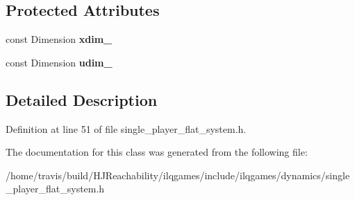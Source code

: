 \subsection*{Protected Attributes}
\begin{DoxyCompactItemize}
\item 
const Dimension {\bfseries xdim\+\_\+}\hypertarget{classilqgames_1_1_single_player_flat_system_aa658a8f808613f170ace84b6aca63a05}{}\label{classilqgames_1_1_single_player_flat_system_aa658a8f808613f170ace84b6aca63a05}

\item 
const Dimension {\bfseries udim\+\_\+}\hypertarget{classilqgames_1_1_single_player_flat_system_a24a3044071823bdd4af74d8d5b89d3d7}{}\label{classilqgames_1_1_single_player_flat_system_a24a3044071823bdd4af74d8d5b89d3d7}

\end{DoxyCompactItemize}


\subsection{Detailed Description}


Definition at line 51 of file single\+\_\+player\+\_\+flat\+\_\+system.\+h.



The documentation for this class was generated from the following file\+:\begin{DoxyCompactItemize}
\item 
/home/travis/build/\+H\+J\+Reachability/ilqgames/include/ilqgames/dynamics/single\+\_\+player\+\_\+flat\+\_\+system.\+h\end{DoxyCompactItemize}
